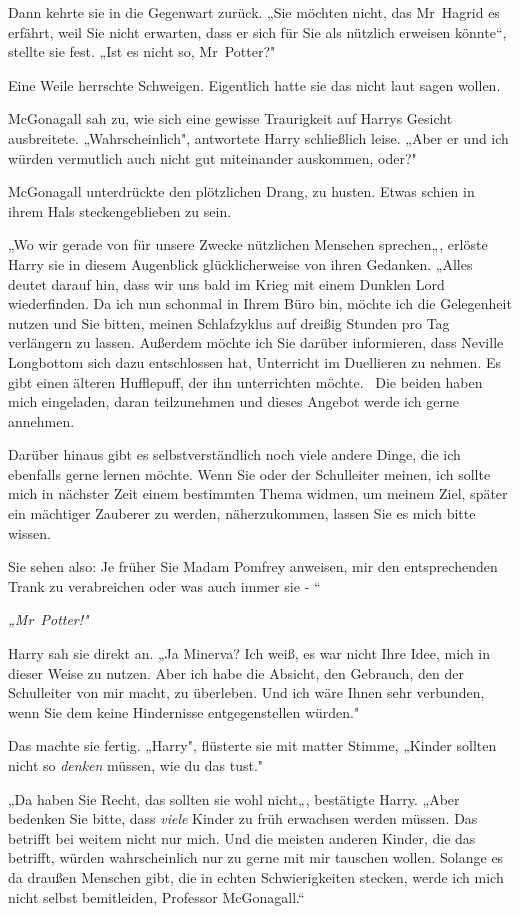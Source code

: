 {Dann kehrte sie in die Gegenwart zurück. „Sie möchten nicht, das Mr~Hagrid es erfährt, weil Sie nicht erwarten, dass er sich für Sie als nützlich erweisen könnte“, stellte sie fest. „Ist es nicht so, Mr~Potter?"

Eine Weile herrschte Schweigen. Eigentlich hatte sie das nicht laut sagen wollen.

McGonagall sah zu, wie sich eine gewisse Traurigkeit auf Harrys Gesicht ausbreitete. „Wahrscheinlich", antwortete Harry schließlich leise. „Aber er und ich würden vermutlich auch nicht gut miteinander auskommen, oder?"

McGonagall unterdrückte den plötzlichen Drang, zu husten. Etwas schien in ihrem Hals steckengeblieben zu sein.

„Wo wir gerade von für unsere Zwecke nützlichen Menschen sprechen„, erlöste Harry sie in diesem Augenblick glücklicherweise von ihren Gedanken. „Alles deutet darauf hin, dass wir uns bald im Krieg mit einem Dunklen Lord wiederfinden. Da ich nun schonmal in Ihrem Büro bin, möchte ich die Gelegenheit nutzen und Sie bitten, meinen Schlafzyklus auf dreißig Stunden pro Tag verlängern zu lassen. Außerdem möchte ich Sie darüber informieren, dass Neville Longbottom sich dazu entschlossen hat, Unterricht im Duellieren zu nehmen. Es gibt einen älteren Hufflepuff, der ihn unterrichten möchte. ~Die beiden haben mich eingeladen, daran teilzunehmen und dieses Angebot werde ich gerne annehmen.

Darüber hinaus gibt es selbstverständlich noch viele andere Dinge, die ich ebenfalls gerne lernen möchte. Wenn Sie oder der Schulleiter meinen, ich sollte mich in nächster Zeit einem bestimmten Thema widmen, um meinem Ziel, später ein mächtiger Zauberer zu werden, näherzukommen, lassen Sie es mich bitte wissen.

Sie sehen also: Je früher Sie Madam Pomfrey anweisen, mir den entsprechenden Trank zu verabreichen oder was auch immer sie - “

\emph{„Mr~Potter!"}

Harry sah sie direkt an. „Ja Minerva? Ich weiß, es war nicht Ihre Idee, mich in dieser Weise zu nutzen. Aber ich habe die Absicht, den Gebrauch, den der Schulleiter von mir macht, zu überleben. Und ich wäre Ihnen sehr verbunden, wenn Sie dem keine Hindernisse entgegenstellen würden."

Das machte sie fertig. „Harry", flüsterte sie mit matter Stimme, „Kinder sollten nicht so \emph{denken} müssen, wie du das tust."

„Da haben Sie Recht, das sollten sie wohl nicht„, bestätigte Harry. „Aber bedenken Sie bitte, dass \emph{viele} Kinder zu früh erwachsen werden müssen. Das betrifft bei weitem nicht nur mich. Und die meisten anderen Kinder, die das betrifft, würden wahrscheinlich nur zu gerne mit mir tauschen wollen. Solange es da draußen Menschen gibt, die in echten Schwierigkeiten stecken, werde ich mich nicht selbst bemitleiden, Professor McGonagall.“

}

